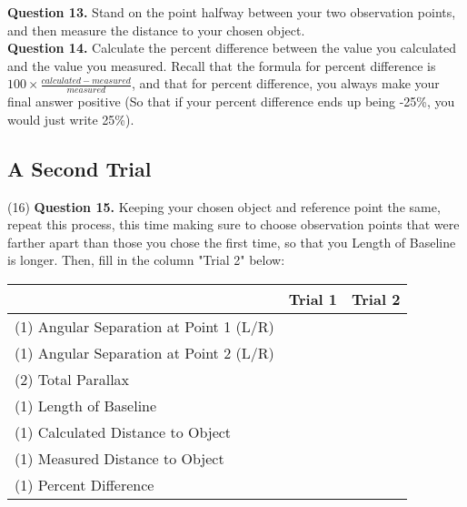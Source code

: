 \documentclass[11pt]{article}
\begin{document}
\textbf{Question 13.} Stand on the point halfway between your two observation points, and then measure the distance to your chosen object.\\

\textbf{Question 14.} Calculate the percent difference between the value you calculated and the value you measured. Recall that the formula for percent difference is $100\times\frac{calculated-measured}{measured}$, and that for percent difference, you always make your final answer positive (So that if your percent difference ends up being -25\%, you would just write 25\%).

\newpage

\subsection*{A Second Trial}

(16) \textbf{Question 15.} Keeping your chosen object and reference point the same, repeat this process, this time making sure to choose observation points that were farther apart than those you chose the first time, so that you Length of Baseline is longer. Then, fill in the column "Trial 2" below: \\

\begin{tabular}{| l | c | c |}
	\hline
	                               & Trial 1\hspace{4cm} & Trial 2\hspace{4cm}  \\ \hline
	(1) Angular Separation at Point 1 (L/R)  &                     &                      \\ \hline
	(1) Angular Separation at Point 2  (L/R) &                     &                      \\ \hline
	(2) Total Parallax                       &                     &                      \\ \hline
	(1) Length of Baseline                   &                     &                      \\ \hline
	(1) Calculated Distance to Object        &                     &                      \\ \hline
	(1) Measured Distance to Object          &                     &                      \\ \hline
	(1) Percent Difference                   &                     &                      \\
	\hline
\end{tabular}\\
\end{document}
